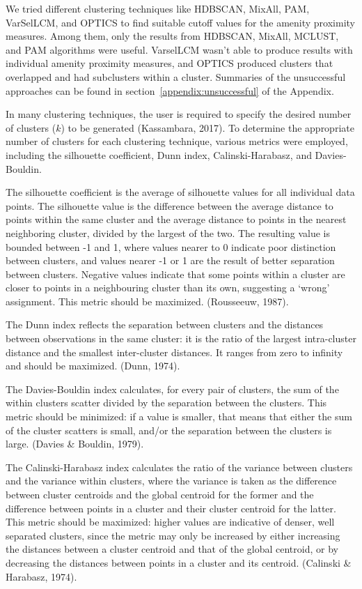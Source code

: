\documentclass[11pt, a4paper]{article}
\begin{document}
We tried different clustering techniques like HDBSCAN, MixAll, PAM, VarSelLCM, and OPTICS to find suitable cutoff values for the amenity proximity measures. Among them, only the results from HDBSCAN, MixAll, MCLUST, and PAM algorithms were useful. VarselLCM wasn't able to produce results with individual amenity proximity measures, and OPTICS produced clusters that overlapped and had subclusters within a cluster. Summaries of the unsuccessful approaches can be found in section~\ref{appendix:unsuccessful} of the Appendix.
\par
In many clustering techniques, the user is required to specify the desired number of clusters ($k$) to be generated (Kassambara, 2017). To determine the appropriate number of clusters for each clustering technique, various metrics were employed, including the silhouette coefficient, Dunn index, Calinski-Harabasz, and Davies-Bouldin. %
\par
The silhouette coefficient is the average of silhouette values for all individual data points. The silhouette value is the difference between the average distance to points within the same cluster and the average distance to points in the nearest neighboring cluster, divided by the largest of the two. The resulting value is bounded between -1 and 1, where values nearer to 0 indicate poor distinction between clusters, and values nearer -1 or 1 are the result of better separation between clusters. Negative values indicate that some points within a cluster are closer to points in a neighbouring cluster than its own, suggesting a `wrong' assignment. This metric should be maximized. (Rousseeuw, 1987).
\par
The Dunn index reflects the separation between clusters and the distances between observations in the same cluster: it is the ratio of the largest intra-cluster distance and the smallest inter-cluster distances. It ranges from zero to infinity and should be maximized. (Dunn, 1974).
\par
The Davies-Bouldin index calculates, for every pair of clusters, the sum of the within clusters scatter divided by the separation between the clusters. This metric should be minimized: if a value is smaller, that means that either the sum of the cluster scatters is small, and/or the separation between the clusters is large. (Davies \& Bouldin, 1979).
\par
The Calinski-Harabasz index calculates the ratio of the variance between clusters and the variance within clusters, where the variance is taken as the difference between cluster centroids and the global centroid for the former and the difference between points in a cluster and their cluster centroid for the latter. This metric should be maximized: higher values are indicative of denser, well separated clusters, since the metric may only be increased by either increasing the distances between a cluster centroid and that of the global centroid, or by decreasing the distances between points in a cluster and its centroid. (Calinski \& Harabasz, 1974).
\end{document}
